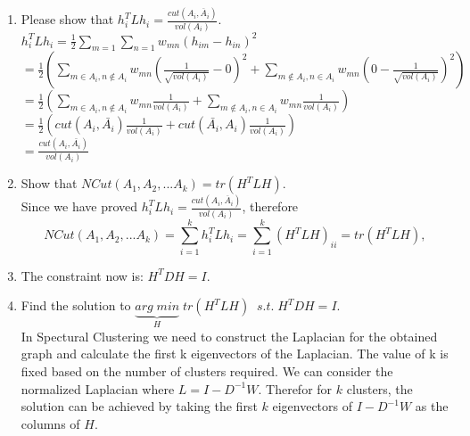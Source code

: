 \documentclass[11pt]{article}
\begin{document}
\begin{enumerate}
	\item Please show that $h_i^TLh_i =\frac{cut(A_i, \overline{A}_i)}{vol(A_i)}$.\\
	$h_i^TLh_i = \frac{1}{2}\displaystyle\sum_{m=1}\displaystyle\sum_{n=1}w_{mn}(h_{im} - h_{in})^2$\\
	$= \frac{1}{2}( \displaystyle\sum_{m \in A_i, n \notin A_i} w_{mn}(\frac{1}{\sqrt{vol(A_i)}} - 0)^2 + \displaystyle\sum_{m \notin A_i, n \in A_i} w_{mn}(0 - \frac{1}{\sqrt{vol(A_i)}})^2)$\\
	$= \frac{1}{2}( \displaystyle\sum_{m \in A_i, n \notin A_i} w_{mn}\frac{1}{vol(A_i)} + \displaystyle\sum_{m \notin A_i, n \in A_i} w_{mn}\frac{1}{vol(A_i)})$\\
	$=\frac{1}{2}(cut(A_i, \bar{A_i})\frac{1}{vol(A_i)} + cut(\bar{A_i},A_i)\frac{1}{vol(A_i)})$\\
	$= \frac{cut(A_i, \bar{A_i})}{vol(A_i)}$
	\item Show that $NCut(A_1,A_2,...A_k) = tr(H^TLH)$.\\
	Since we have proved $h_i^TLh_i =\frac{cut(A_i, \overline{A}_i)}{vol(A_i)}$, therefore
	\begin{equation}
	NCut(A_1,A_2,...A_k) = \sum\limits_{i=1}^{k}h_i^TLh_i = \sum\limits_{i=1}^{k}(H^TLH)_{ii} = tr(H^TLH),
	\end{equation}
	\item The constraint now is: $H^TDH=I$.
	\item Find the solution to $\underbrace{arg\;min}_H\; tr(H^TLH) \;\; s.t.\;H^TDH=I$.\\
	In Spectural Clustering we need to construct the Laplacian for the obtained graph and
calculate the first k eigenvectors of the Laplacian. The value of k is fixed based on the number of clusters required. We can consider the normalized Laplacian where $L = I - D^{-1}W$. Therefor for $k$ clusters, the solution can be achieved by taking the first $k$ eigenvectors of $I - D^{-1}W$ as the columns of $H$.
\end{enumerate}

\newpage
\end{document}
